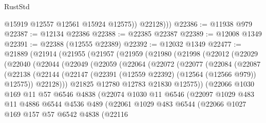 \begin{lexlean}{RustStd}
\begin{coremodule}
              @15919
              @12557
              @12561
              @15924
              @12575))
          @22128)))
@22386 := @11938 @979
@22387 := @12134 @22386
@22388 := @22385 @22387
@22389 := @12008 @1349
@22391 := @22388 (@12555 @22389)
@22392 := @12032 @1349
@22477 := @21889
    (@21914
      (@21955
        (@21957
          (@21959
            (@21980
              (@21998
                (@22012
                  (@22029
                    (@22040
                      (@22044
                        (@22049
                          (@22059
                            (@22064
                              (@22072
                                (@22077
                                  (@22084
                                    (@22087
                                      (@22138
                                        (@22144
                                          (@22147
                                            (@22391 (@12559 @22392) (@12564 (@12566 @979)) @12575))
                                          @22128)))
                                    @21825
                                    @12780
                                    @12783
                                    @21830
                                    @12575))
                                (@22066
                                  @1030
                                  @169
                                  @11
                                  @57
                                  @6546
                                  @4838
                                  (@22074
                                    @1030
                                    @11
                                    @6546
                                    (@22097
                                      @1029
                                      @483
                                      @11
                                      @4886
                                      @6544
                                      @4536
                                      @489
                                      (@22061
                                        @1029
                                        @483
                                        @6544
                                        (@22066
                                          @1027
                                          @169
                                          @157
                                          @57
                                          @6542
                                          @4838
                                          (@22116

\end{coremodule}
\end{lexlean}

